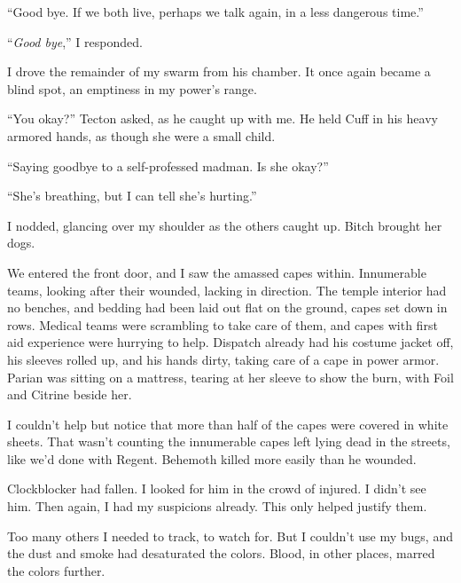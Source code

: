 ``Good bye.  If we both live, perhaps we talk again, in a less dangerous time.''



``\emph{Good bye},'' I responded.



I drove the remainder of my swarm from his chamber.  It once again became a blind spot, an emptiness in my power's range.



``You okay?'' Tecton asked, as he caught up with me.  He held Cuff in his heavy armored hands, as though she were a small child.



``Saying goodbye to a self-professed madman.  Is she okay?''



``She's breathing, but I can tell she's hurting.''



I nodded, glancing over my shoulder as the others caught up.  Bitch brought her dogs.



We entered the front door, and I saw the amassed capes within.  Innumerable teams, looking after their wounded, lacking in direction.  The temple interior had no benches, and bedding had been laid out flat on the ground, capes set down in rows.  Medical teams were scrambling to take care of them, and capes with first aid experience were hurrying to help.  Dispatch already had his costume jacket off, his sleeves rolled up, and his hands dirty, taking care of a cape in power armor.  Parian was sitting on a mattress, tearing at her sleeve to show the burn, with Foil and Citrine beside her.



I couldn't help but notice that more than half of the capes were covered in white sheets.  That wasn't counting the innumerable capes left lying dead in the streets, like we'd done with Regent.  Behemoth killed more easily than he wounded.



Clockblocker had fallen.  I looked for him in the crowd of injured.  I didn't see him.  Then again, I had my suspicions already.  This only helped justify them.



Too many others I needed to track, to watch for.  But I couldn't use my bugs, and the dust and smoke had desaturated the colors.  Blood, in other places, marred the colors further.



